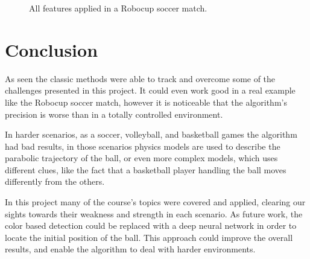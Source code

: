 \documentclass[10pt,twocolumn,letterpaper]{article}
\begin{document}
\begin{figure}[!h]
	\centering
	\setlength{\fboxsep}{1pt}
	\setlength{\fboxrule}{1pt}
	\caption{All features applied in a Robocup soccer match.}\label{fig:robocup2}
\end{figure}

\section{Conclusion}\label{sec:conclusion}

As seen the classic methods were able to track and overcome some of the
challenges presented in this project. It could even work good in a real example like the Robocup soccer match, however it is noticeable that the algorithm's precision is worse than in a totally controlled environment.

In harder scenarios, as a soccer, volleyball, and basketball games the algorithm had  bad results, in those scenarios physics models are used to describe the parabolic trajectory of the ball, or even  more complex models, which uses different clues, like the fact that a basketball player handling the ball moves differently from the others.

In this project  many of the course's topics were covered and applied, clearing our sights towards their weakness and strength in each scenario. As future work, the color based detection could be replaced with a deep neural network in order to locate the initial position of the ball. This approach could improve the overall results, and enable the algorithm to deal with harder environments.

{\small


}
\end{document}
